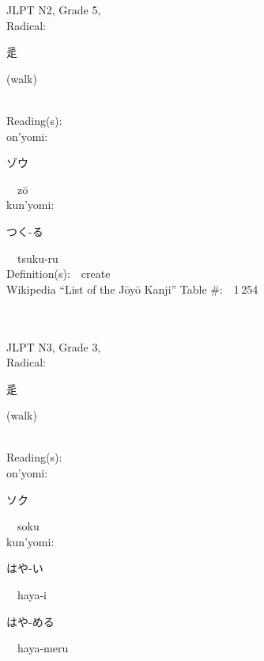 \begin{multicols}{2}
{JLPT N2, Grade 5, \\Radical:\ \ {\begin{CJK}{UTF8}{min} 辵 \end{CJK}} (walk) } \\
Reading(s):\ \ \\
{\hspace*{1em}}on'yomi:\ \ \\
{\hspace*{2em}}{\begin{CJK}{UTF8}{min} ゾウ \end{CJK}}\ \ z\=o\ \ \\
{\hspace*{1em}}kun'yomi:\ \ \\
{\hspace*{2em}}{\begin{CJK}{UTF8}{min} つく-る \end{CJK}}\ \ tsuku-ru\ \ \\
Definition(s):\ \ create \\
Wikipedia ``List of the J\=oy\=o Kanji'' Table \#:\ \ 1\,254 \\
\ \ \\
{\fontsize{34pt}{40pt}  }\ \ \\  %
{JLPT N3, Grade 3, \\Radical:\ \ {\begin{CJK}{UTF8}{min} 辵 \end{CJK}} (walk) } \\
Reading(s):\ \ \\
{\hspace*{1em}}on'yomi:\ \ \\
{\hspace*{2em}}{\begin{CJK}{UTF8}{min} ソク \end{CJK}}\ \ soku\ \ \\
{\hspace*{1em}}kun'yomi:\ \ \\
{\hspace*{2em}}{\begin{CJK}{UTF8}{min} はや-い \end{CJK}}\ \ haya-i\ \ \\
{\hspace*{2em}}{\begin{CJK}{UTF8}{min} はや-める \end{CJK}}\ \ haya-meru\ \ \\

\end{multicols}
